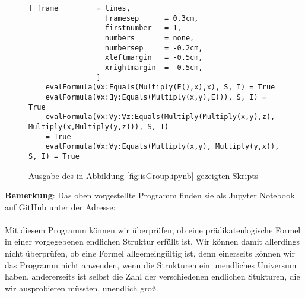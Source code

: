 \begin{figure}[!ht]
\centering
\begin{Verbatim}[ frame         = lines, 
                  framesep      = 0.3cm, 
                  firstnumber   = 1,
                  numbers       = none,
                  numbersep     = -0.2cm,
                  xleftmargin   = -0.5cm,
                  xrightmargin  = -0.5cm,
                ]
    evalFormula(∀x:Equals(Multiply(E(),x),x), S, I) = True
    evalFormula(∀x:∃y:Equals(Multiply(x,y),E()), S, I) = True
    evalFormula(∀x:∀y:∀z:Equals(Multiply(Multiply(x,y),z), Multiply(x,Multiply(y,z))), S, I)
    = True
    evalFormula(∀x:∀y:Equals(Multiply(x,y), Multiply(y,x)), S, I) = True
\end{Verbatim}
\vspace*{-0.3cm}
\caption{Ausgabe des in Abbildung \ref{fig:isGroup.ipynb} gezeigten Skripts}
\label{fig:isGroup.out}
\end{figure}

\noindent
\textbf{Bemerkung}:  Das oben vorgestellte Programm finden sie als Jupyter Notebook auf GitHub unter der Adresse:
\\[0.2cm]
\hspace*{0.8cm}
\href{https://github.com/karlstroetmann/Logic/blob/master/Python/FOL-Evaluation.ipynb}{}
\\[0.2cm]
Mit diesem Programm können wir überprüfen, ob eine
prädikatenlogische Formel in einer vorgegebenen endlichen Struktur erfüllt ist. Wir können damit
allerdings nicht überprüfen, ob eine Formel allgemeingültig ist, denn einerseits können
wir das Programm nicht anwenden, wenn die Strukturen ein unendliches Universum haben,
andererseits ist selbst die Zahl der verschiedenen endlichen Stukturen, die wir ausprobieren
müssten, unendlich groß.  \eox

